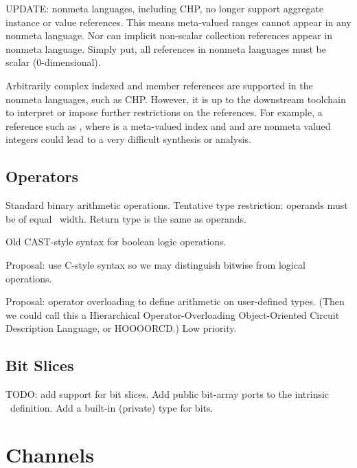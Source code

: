 UPDATE: nonmeta languages, including CHP, no longer support 
aggregate instance or value references.  
This means meta-valued ranges cannot appear in any nonmeta language.  
Nor can implicit non-scalar collection references appear in nonmeta language.  
Simply put, all references in nonmeta languages must be scalar
(0-dimensional).  

Arbitrarily complex indexed and member references
are supported in the nonmeta languages, such as CHP.
However, it is up to the downstream toolchain to interpret or 
impose further restrictions on the references. 
For example, a reference such as , where
 is a meta-valued index and  and  are nonmeta
valued integers could lead to a very difficult synthesis or analysis.  

\subsection{Operators}
\label{sec:chp:expr:ops}

Standard binary arithmetic operations.  
Tentative type restriction: operands must be of equal \int\ width.  
Return type is the same as operands.  

Old CAST-style syntax for boolean logic operations.  

Proposal: use C-style syntax so we may distinguish bitwise from 
logical operations.  

Proposal: operator overloading to define arithmetic on user-defined types.  
(Then we could call this a Hierarchical Operator-Overloading Object-Oriented
Circuit Description Language, or HOOOORCD.)
Low priority.  

\subsection{Bit Slices}
\label{sec:chp:expr:bits}

TODO: add support for bit slices.  
Add public bit-array ports to the intrinsic \int\ definition.  
Add a built-in (private) type for bits.  

\section{Channels}
\label{sec:chp:channels}

